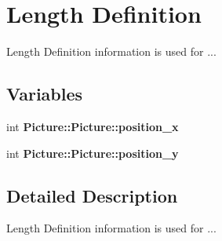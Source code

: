 \hypertarget{group__length__definition}{}\section{Length Definition}
\label{group__length__definition}


Length Definition information is used for ...  


\subsection*{Variables}
\begin{DoxyCompactItemize}
\item 
\mbox{\label{group__length__definition_gabc618c40aa01ec5878903a3170e1867a}} 
int {\bfseries Picture\+::\+Picture\+::position\+\_\+x}
\item 
\mbox{\label{group__length__definition_gaad6be8d081af96530b6de3094b979af9}} 
int {\bfseries Picture\+::\+Picture\+::position\+\_\+y}
\end{DoxyCompactItemize}


\subsection{Detailed Description}
Length Definition information is used for ... 

